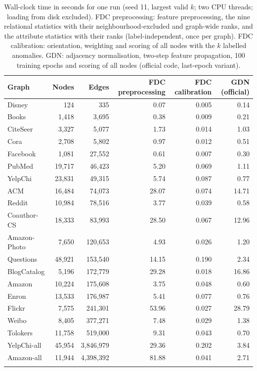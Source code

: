 \documentclass[pdflatex,sn-mathphys-ay]{sn-jnl}
\theoremstyle{plain}
\theoremstyle{remark}
\begin{document}
\begin{table}[!ht]
\caption{Wall-clock time in seconds for one run (seed 11, largest valid $k$; two CPU threads; loading from disk excluded). FDC preprocessing: feature preprocessing, the nine relational statistics with their neighbourhood-excluded and graph-wide ranks, and the attribute statistics with their ranks (label-independent, once per graph). FDC calibration: orientation, weighting and scoring of all nodes with the $k$ labelled anomalies. GDN: adjacency normalisation, two-step feature propagation, 100 training epochs and scoring of all nodes (official code, last-epoch variant).}
\label{tab:runtime}
\footnotesize
\begin{tabular*}{\textwidth}{@{\extracolsep{\fill}}lrrrrr@{}}
\toprule
Graph & Nodes & Edges & FDC preprocessing & FDC calibration & GDN (official) \\
\midrule
Disney & 124 & 335 & 0.07 & 0.005 & 0.14 \\
Books & 1,418 & 3,695 & 0.38 & 0.009 & 0.21 \\
CiteSeer & 3,327 & 5,077 & 1.73 & 0.014 & 1.03 \\
Cora & 2,708 & 5,802 & 0.97 & 0.012 & 0.51 \\
Facebook & 1,081 & 27,552 & 0.61 & 0.007 & 0.30 \\
PubMed & 19,717 & 46,423 & 5.20 & 0.069 & 1.11 \\
YelpChi & 23,831 & 49,315 & 5.74 & 0.087 & 0.77 \\
ACM & 16,484 & 74,073 & 28.07 & 0.074 & 14.71 \\
Reddit & 10,984 & 78,516 & 3.77 & 0.039 & 0.58 \\
Coauthor-CS & 18,333 & 83,993 & 28.50 & 0.067 & 12.96 \\
Amazon-Photo & 7,650 & 120,653 & 4.93 & 0.026 & 1.20 \\
Questions & 48,921 & 153,540 & 14.15 & 0.190 & 2.34 \\
BlogCatalog & 5,196 & 172,779 & 29.28 & 0.018 & 16.86 \\
Amazon & 10,224 & 175,608 & 3.75 & 0.048 & 0.60 \\
Enron & 13,533 & 176,987 & 5.41 & 0.077 & 0.76 \\
Flickr & 7,575 & 241,301 & 53.96 & 0.027 & 28.79 \\
Weibo & 8,405 & 377,271 & 7.48 & 0.029 & 1.38 \\
Tolokers & 11,758 & 519,000 & 9.31 & 0.043 & 0.70 \\
YelpChi-all & 45,954 & 3,846,979 & 29.36 & 0.202 & 3.84 \\
Amazon-all & 11,944 & 4,398,392 & 81.88 & 0.041 & 2.71 \\
\botrule
\end{tabular*}
\end{table}
\end{document}
